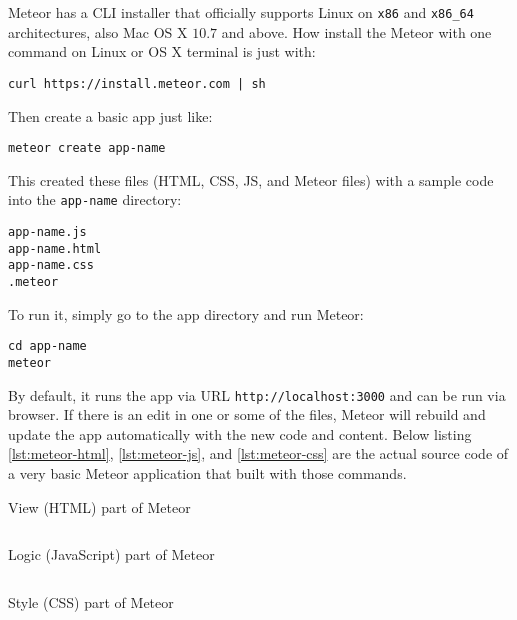 Meteor has a \ac{CLI} installer that officially supports Linux on \verb|x86| and \verb|x86_64| architectures, also Mac OS X $10.7$ and above.
How install the Meteor with one command on Linux or OS X terminal is just with:

\begin{verbatim}
curl https://install.meteor.com | sh
\end{verbatim}

\noindent Then create a basic app just like:

\begin{verbatim}
meteor create app-name
\end{verbatim}

This created these files (\ac{HTML}, \ac{CSS}, \ac{JS}, and Meteor files) with a sample code into the \verb|app-name| directory:

\begin{verbatim}
app-name.js
app-name.html
app-name.css
.meteor
\end{verbatim}

To run it, simply go to the app directory and run Meteor:

\begin{verbatim}
cd app-name
meteor
\end{verbatim}

By default, it runs the app via \ac{URL} \verb|http://localhost:3000| and can be run via browser.
If there is an edit in one or some of the files, Meteor will rebuild and update the app automatically with the new code and content.
\noindent Below listing \autoref{lst:meteor-html}, \autoref{lst:meteor-js}, and \autoref{lst:meteor-css} are the actual source code of a very basic Meteor application that built with those commands.

\begin{listing}[!ht]
\caption{View (HTML) part of Meteor}
\inputminted{html}{\dir/include/meteor/meteor.html}
\label{lst:meteor-html}
\end{listing}

\begin{listing}[!ht]
\caption{Logic (JavaScript) part of Meteor}
\inputminted{javascript}{\dir/include/meteor/meteor.js}
\label{lst:meteor-js}
\end{listing}

\begin{listing}[!ht]
\caption{Style (CSS) part of Meteor}
\inputminted{css}{\dir/include/meteor/meteor.css}
\label{lst:meteor-css}
\end{listing}
